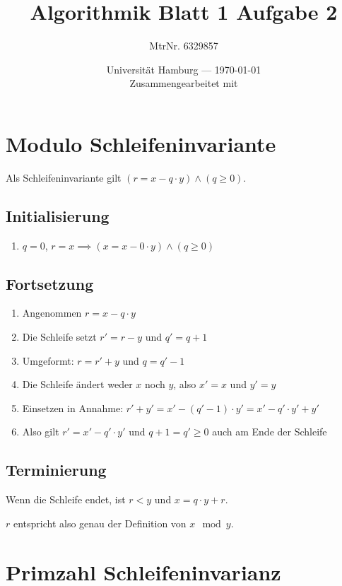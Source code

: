 \documentclass[parskip=half,a4paper]{scrartcl}
\title{Algorithmik Blatt 1 Aufgabe 2}
\author{MtrNr. 6329857}
\date{Universität Hamburg --- \today \\ Zusammengearbeitet mit}
\begin{document}
\maketitle

\section*{Modulo Schleifeninvariante}

Als Schleifeninvariante gilt $(r = x - q \cdot y) \land (q ≥ 0)$.

\subsection*{Initialisierung}

\begin{enumerate}
	\item  $q = 0$, $r = x \implies (x = x - 0 \cdot y) \land (q \ge 0)$
\end{enumerate}

\subsection*{Fortsetzung}

\begin{enumerate}
	\item Angenommen $r = x - q \cdot y$
	\item Die Schleife setzt $r' = r - y$ und $q' = q + 1$
	\item Umgeformt: $r = r' + y$ und $q = q' - 1$
	\item Die Schleife ändert weder $x$ noch $y$, also $x' = x$ und $y' = y$
	\item Einsetzen in Annahme: $r' + y' = x' - (q' - 1)  \cdot y' = x' - q' \cdot y' + y'$
	\item Also gilt $r' = x' - q' \cdot y'$ und $q + 1 = q' ≥ 0$ auch am Ende der Schleife
\end{enumerate}

\subsection*{Terminierung}

Wenn die Schleife endet, ist $r < y$ und $x = q \cdot y + r$. 

$r$ entspricht also genau der Definition von $x \mod y$.

\section*{Primzahl Schleifeninvarianz}
\end{document}
